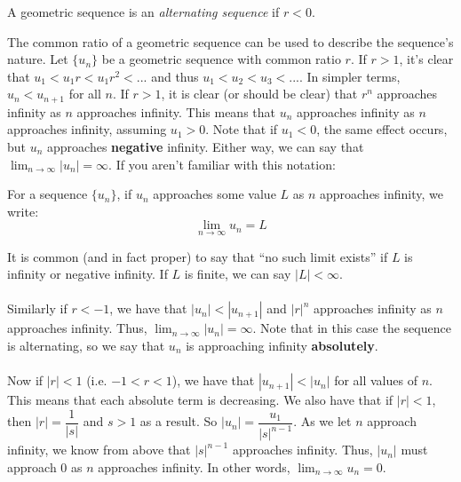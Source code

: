 \documentclass[12pt, a4paper, titlepage, twoside]{article}
\begin{document}
	\hfill
	
	\begin{kp}
		A geometric sequence is an \textit{alternating sequence} if $r < 0$.
	\end{kp}
	
	The common ratio of a geometric sequence can be used to describe the sequence's nature. Let $\{u_n\}$ be a geometric
	sequence with common ratio $r$. If $r > 1$, it's clear that $u_1 < u_1 r < u_1 r^2 < ...$ and thus $u_1 < u_2 < u_3 < ...$.
	In simpler terms, $u_n < u_{n+1}$ for all $n$.
	If $r >1$, it is clear (or should be clear) that $r^n$ approaches infinity as $n$ approaches infinity.
	This means that $u_n$ approaches infinity as $n$ approaches infinity, assuming $u_1 > 0$. Note that if $u_1 < 0$, the
	same effect occurs, but $u_n$ approaches \textbf{negative} infinity. Either way, we can say that $\displaystyle 
	\lim_{n \to \infty} |u_n| = \infty$. If you aren't familiar with this notation:\\
	
	\begin{kp}
		For a sequence $\{u_n\}$, if $u_n$ approaches some value $L$ as $n$ approaches infinity, we write:
		$$\lim_{n \to \infty} u_n = L$$
		
		It is common (and in fact proper) to say that ``no such limit exists'' if $L$ is infinity or negative infinity. If $L$ is finite, 
		we can say $|L| < \infty$.
	\end{kp}
	
	\paragraph{}
	Similarly if $r < -1$, we have that $|u_n| < |u_{n+1}|$ and $|r|^n$ approaches infinity as $n$ approaches infinity. Thus, 
	$\displaystyle \lim_{n \to \infty} |u_n| = \infty$. Note that in this case the sequence is alternating, so we say that $u_n$ is 
	approaching infinity \textbf{absolutely}. 
	
	\paragraph{}
	Now if $|r| < 1$ (i.e. $-1 < r < 1$), we have that $|u_{n+1}| < |u_n|$ for all values of $n$. This means that each absolute term is 
	decreasing. We also have that if $|r| < 1$, then $|r| = \dfrac{1}{|s|}$ and $s>1$ as a result. So $|u_n| = \dfrac{u_1}{|s|^{n-1}}$.
	As we let $n$ approach infinity, we know from above that $|s|^{n-1}$ approaches infinity. Thus, $|u_n|$ must approach 0 as $n$ 
	approaches infinity. In other words, $\displaystyle \lim_{n \to \infty} u_n = 0$.
	
\end{document}
